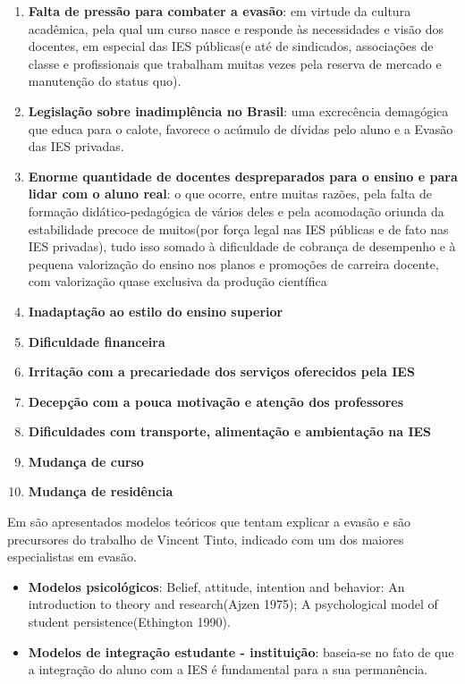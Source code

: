\documentclass{report}
\begin{document}
\begin{enumerate}
\item \textbf{Falta de pressão para combater a evasão}: em virtude da cultura acadêmica, pela qual um curso nasce e responde às necessidades e visão dos docentes, em especial das IES públicas(e até de sindicados, associações de classe e profissionais que trabalham muitas vezes pela reserva de mercado e manutenção do status quo).

\item \textbf{Legislação sobre inadimplência no Brasil}: uma excrecência demagógica que educa para o calote, favorece o acúmulo de dívidas pelo aluno e a Evasão das IES privadas.

\item \textbf{Enorme quantidade de docentes despreparados para o ensino e para lidar com o aluno real}: o que ocorre, entre muitas razões, pela falta de formação didático-pedagógica de vários deles e pela acomodação oriunda da estabilidade precoce de muitos(por força legal nas IES públicas e de fato nas IES privadas), tudo isso somado à dificuldade de cobrança de desempenho e à pequena valorização do ensino nos planos e promoções de carreira docente, com valorização quase exclusiva da produção científica

\item \textbf{Inadaptação ao estilo do ensino superior}

\item \textbf{Dificuldade financeira}

\item \textbf{Irritação com a precariedade dos serviços oferecidos pela IES}

\item \textbf{Decepção com a pouca motivação e atenção dos professores}

\item \textbf{Dificuldades com transporte, alimentação e ambientação na IES}

\item \textbf{Mudança de curso}

\item \textbf{Mudança de residência}

\end{enumerate}

Em \cite{evasao_panorama2} são apresentados modelos teóricos que tentam explicar a evasão e são precursores do trabalho de Vincent Tinto, indicado com um dos maiores especialistas em evasão.

\begin{itemize}
\item \textbf{Modelos psicológicos}: Belief, attitude, intention and behavior: An introduction to theory and research(Ajzen 1975); A psychological model of student persistence(Ethington 1990).

\item \textbf{Modelos de integração estudante - instituição}: baseia-se no fato de que a integração do aluno com a IES é fundamental para a sua permanência.
\end{itemize}
\end{document}
